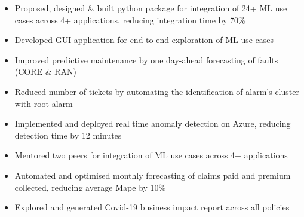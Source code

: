\documentclass[10pt,a4paper,ragged2e,withhyper]{altacv}
\author{Madhusudan Kumar}
\date{\today}
\title{}
\begin{document}

\makecvheader

\begin{paracol}{2}
\label{sec:org4b40362}
\begin{itemize}
\item Proposed, designed \& built python package for integration of 24+ ML use cases across 4+ applications, reducing integration time by 70\%
\item Developed GUI application for end to end exploration of ML use cases
\item Improved predictive maintenance by one day-ahead forecasting of faults (CORE \& RAN)
\item Reduced number of tickets by automating the identification of alarm’s cluster with root alarm
\item Implemented and deployed real time anomaly detection on Azure, reducing detection time by 12 minutes
\item Mentored two peers for integration of ML use cases across 4+ applications
\end{itemize}

\par\divider
{}
\begin{itemize}
\item Automated and optimised monthly forecasting of claims paid and premium collected, reducing average Mape by 10\%
\item Explored and generated Covid-19 business impact report across all policies
\end{itemize}

\par\divider



\end{paracol}
\end{document}

